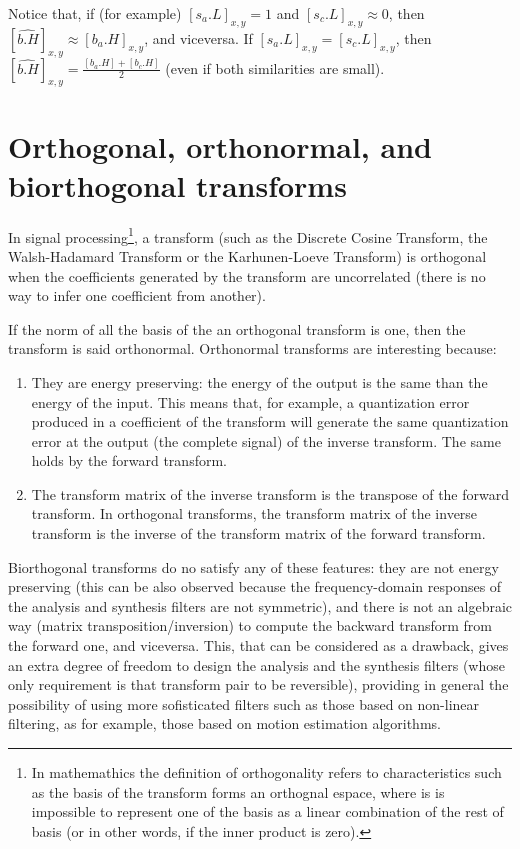Notice that, if (for example) $[s_a.L]_{x,y}=1$ and
$[s_c.L]_{x,y}\approx 0$, then
$[\hat{b.H}]_{x,y}\approx [b_a.H]_{x,y}$, and viceversa. If
$[s_a.L]_{x,y}=[s_c.L]_{x,y}$, then
$[\hat{b.H}]_{x,y}=\frac{[b_a.H]+[b_c.H]}{2}$ (even if both similarities are small).



\section{Orthogonal, orthonormal, and biorthogonal transforms}
In signal processing\footnote{In mathemathics the definition of
  orthogonality refers to characteristics such as the basis of the
  transform forms an orthognal espace, where is is impossible to
  represent one of the basis as a linear combination of the rest of
  basis (or in other words, if the inner product is zero).}, a
transform (such as the Discrete Cosine Transform, the Walsh-Hadamard
Transform or the Karhunen-Loeve Transform) is orthogonal when the
coefficients generated by the transform are uncorrelated (there is no
way to infer one coefficient from another).

If the norm of all the basis of the an orthogonal transform is one,
then the transform is said orthonormal. Orthonormal transforms are
interesting because:
\begin{enumerate}
\item They are energy preserving: the energy of the output is the same
  than the energy of the input. This means that, for example, a
  quantization error produced in a coefficient of the transform will
  generate the same quantization error at the output (the complete
  signal) of the inverse transform. The same holds by the forward
  transform.
\item The transform matrix of the inverse transform is the transpose
  of the forward transform. In orthogonal transforms, the transform
  matrix of the inverse transform is the inverse of the transform
  matrix of the forward transform.
\end{enumerate}

Biorthogonal transforms do no satisfy any of these features: they are
not energy preserving (this can be also observed because the
frequency-domain responses of the analysis and synthesis filters are
not symmetric), and there is not an algebraic way (matrix
transposition/inversion) to compute the backward transform from the
forward one, and viceversa. This, that can be considered as a
drawback, gives an extra degree of freedom to design the analysis and
the synthesis filters (whose only requirement is that transform pair
to be reversible), providing in general the possibility of using more
sofisticated filters such as those based on non-linear filtering, as
for example, those based on motion estimation algorithms.

